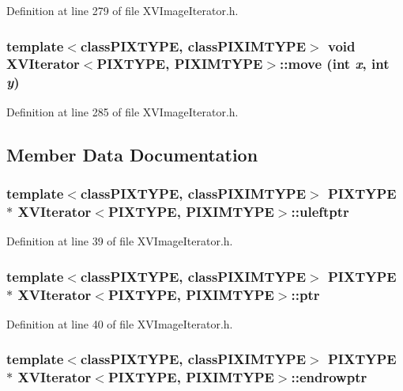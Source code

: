 Definition at line 279 of file XVImage\-Iterator.h.\label{XVIterator_a21}
\hypertarget{class_XVIterator_a21}{
\subsubsection[move]{\setlength{\rightskip}{0pt plus 5cm}template$<$classPIXTYPE, classPIXIMTYPE$>$ void XVIterator$<$PIXTYPE, PIXIMTYPE$>$::move (int {\em x}, int {\em y})}}




Definition at line 285 of file XVImage\-Iterator.h.

\subsection{Member Data Documentation}
\label{XVIterator_n0}
\hypertarget{class_XVIterator_n0}{
\subsubsection[uleftptr]{\setlength{\rightskip}{0pt plus 5cm}template$<$classPIXTYPE, classPIXIMTYPE$>$ PIXTYPE $\ast$ XVIterator$<$PIXTYPE, PIXIMTYPE$>$::uleftptr}}




Definition at line 39 of file XVImage\-Iterator.h.\label{XVIterator_n1}
\hypertarget{class_XVIterator_n1}{
\subsubsection[ptr]{\setlength{\rightskip}{0pt plus 5cm}template$<$classPIXTYPE, classPIXIMTYPE$>$ PIXTYPE $\ast$ XVIterator$<$PIXTYPE, PIXIMTYPE$>$::ptr}}




Definition at line 40 of file XVImage\-Iterator.h.\label{XVIterator_n2}
\hypertarget{class_XVIterator_n2}{
\subsubsection[endrowptr]{\setlength{\rightskip}{0pt plus 5cm}template$<$classPIXTYPE, classPIXIMTYPE$>$ PIXTYPE $\ast$ XVIterator$<$PIXTYPE, PIXIMTYPE$>$::endrowptr}}




